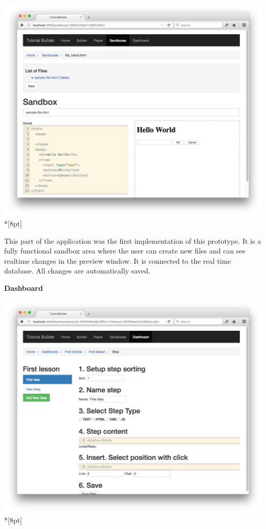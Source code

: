 \documentclass[12pt, a4paper, oneside, openright, medskipamount]{report}
\begin{document}
\includegraphics[width=1\textwidth]{assets/tour-screenshots/the-sandbox.png}\\*[8pt]

This part of the application was the first implementation of this prototype. It is a fully functional sandbox area where the user can create new files and can see realtime changes in the preview window. It is connected to the real time database. All changes are automatically saved.

\newpage

\textbf{Dashboard}

\includegraphics[width=1\textwidth]{assets/tour-screenshots/dashboard.png}\\*[8pt]
\end{document}
